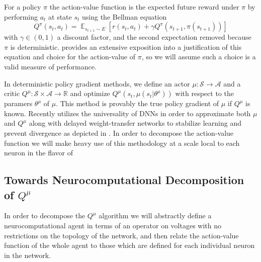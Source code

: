 \documentclass{article} %
\numberwithin{equation}{subsection}
\numberwithin{theorem}{subsection}
\def\expect{\mathop{{\mathbb{E}}}}
\def\scripta{{\mathcal A}}
\def\scripts{{\mathcal S}}
\begin{document}
For a policy $\pi$  the action-value function is the expected future reward under $\pi$ by performing $a_t$ at state $s_t$ using the Bellman equation
\begin{equation}
    Q^{\pi}(s_t, a_t) = \expect_{s_{t+1} \sim E}\left[r(s_{t}, a_t) + \gamma Q^{\pi}(s_{t+1}, \pi(s_{t+1}))\right]
\end{equation}
with $\gamma \in (0,1)$ a discount factor, and the second expectation removed because $\pi$ is deterministic.  provides an extensive exposition into a justification of this equation and choice for the action-value of $\pi$, so we will assume such a choice is a valid measure of performance.

In deterministic policy gradient methods, we define an actor $\mu: \scripts \to \scripta$ and a critic $Q^\mu: \scripts \times \scripta \to \mathbb{R}$ and optimize $Q^\mu(s_t, \mu(s_t | \theta^{\mu}))$ with respect to the paramers $\theta^\mu$ of $\mu.$ This method is provably the true policy gradient of $\mu$ if $Q^\mu$ is known. Recently  utilizes the universality of DNNs in order to approximate both $\mu$ and $Q^\mu$ along with delayed weight-transfer networks to stabilize learning and  prevent divergence as depicted in . In order to decompose the action-value function we will make heavy use of this methodology at a scale local to each neuron in the flavor of 

\subsection{Towards Neurocomputational Decomposition of $Q^\mu$}

In order to decompose the $Q^\mu$ algorithm we will abstractly define a neurocomputational agent in terms of an operator on voltages with no restrictions on the topology of the network, and then relate the action-value function of the whole agent to those which are defined for each individual neuron in the network.
\end{document}
